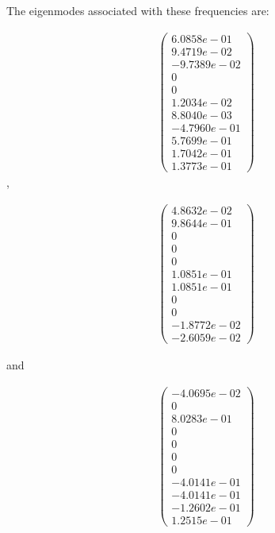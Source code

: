 The eigenmodes associated with these frequencies are:

\begin{equation}
    \begin{split}
        \begin{pmatrix}
            6.0858e-01\\
            9.4719e-02\\
            -9.7389e-02\\
                        0\\
                        0\\
            1.2034e-02\\
            8.8040e-03\\
            -4.7960e-01\\
            5.7699e-01\\
            1.7042e-01\\
            1.3773e-01
        \end{pmatrix}
    \end{split}
\end{equation},

\begin{equation}
    \begin{split}
        \begin{pmatrix}
            4.8632e-02\\
            9.8644e-01\\
                    0\\
                    0\\
                    0\\
            1.0851e-01\\
            1.0851e-01\\
                    0\\
                    0\\
            -1.8772e-02\\
            -2.6059e-02
        \end{pmatrix}
    \end{split}
\end{equation}

and

\begin{equation}
    \begin{split}
        \begin{pmatrix}
            -4.0695e-02\\
                    0\\
            8.0283e-01\\
                    0\\
                    0\\
                    0\\
                    0\\
            -4.0141e-01\\
            -4.0141e-01\\
            -1.2602e-01\\
            1.2515e-01
        \end{pmatrix}
    \end{split}
\end{equation}

